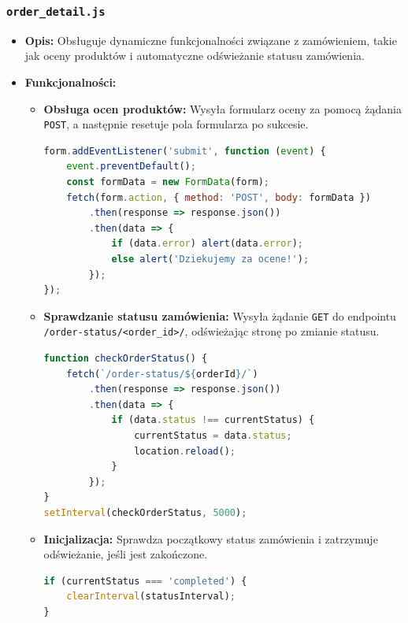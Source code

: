\documentclass[12pt,a4paper,oneside]{article}
\theoremstyle{definition}
\numberwithin{equation}{section}
\begin{document}
\subsubsection*{\texttt{order\_detail.js}}
\begin{itemize}
    \item \textbf{Opis:} 
    Obsługuje dynamiczne funkcjonalności związane z zamówieniem, takie jak oceny produktów i automatyczne odświeżanie statusu zamówienia.
    \item \textbf{Funkcjonalności:}
    \begin{itemize}
        \item \textbf{Obsługa ocen produktów:}
        Wysyła formularz oceny za pomocą żądania \texttt{POST}, a następnie resetuje pola formularza po sukcesie.
        \begin{lstlisting}[language=JavaScript]
form.addEventListener('submit', function (event) {
    event.preventDefault();
    const formData = new FormData(form);
    fetch(form.action, { method: 'POST', body: formData })
        .then(response => response.json())
        .then(data => {
            if (data.error) alert(data.error);
            else alert('Dziekujemy za ocene!');
        });
});
        \end{lstlisting}
        \item \textbf{Sprawdzanie statusu zamówienia:}
        Wysyła żądanie \texttt{GET} do endpointu \texttt{/order-status/<order\_id>/}, odświeżając stronę po zmianie statusu.
        \begin{lstlisting}[language=JavaScript]
function checkOrderStatus() {
    fetch(`/order-status/${orderId}/`)
        .then(response => response.json())
        .then(data => {
            if (data.status !== currentStatus) {
                currentStatus = data.status;
                location.reload();
            }
        });
}
setInterval(checkOrderStatus, 5000);
        \end{lstlisting}
        \item \textbf{Inicjalizacja:} Sprawdza początkowy status zamówienia i zatrzymuje odświeżanie, jeśli jest zakończone.
        \begin{lstlisting}[language=JavaScript]
if (currentStatus === 'completed') {
    clearInterval(statusInterval);
}
        \end{lstlisting}
    \end{itemize}
\end{itemize}


% 
% 
\end{document}

